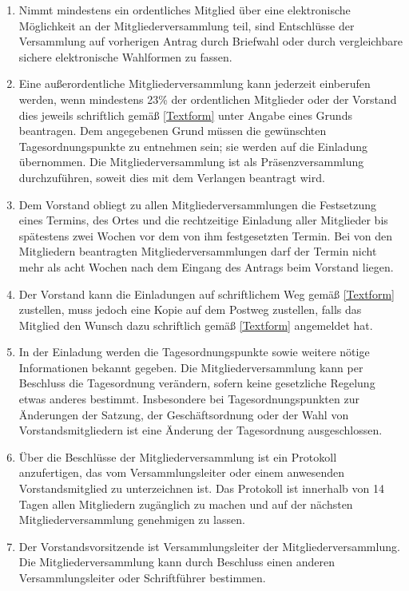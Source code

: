 \documentclass[fontsize=12pt,paper=a4,pagesize,headings=small]{scrartcl}
\begin{document}
\begin{enumerate}
    \item Nimmt mindestens ein ordentliches Mitglied über eine elektronische
    Möglichkeit an der Mitgliederversammlung teil, sind Entschlüsse der
    Versammlung auf vorherigen Antrag durch Briefwahl oder durch
    vergleichbare sichere elektronische Wahlformen zu fassen.

    \item Eine außerordentliche Mitgliederversammlung kann jederzeit
    einberufen werden, wenn mindestens 23\% der ordentlichen Mitglieder
    oder der Vorstand dies jeweils schriftlich gemäß \ref{Textform}
    unter Angabe eines Grunds beantragen. Dem angegebenen Grund müssen
    die gewünschten Tagesordnungspunkte zu entnehmen sein; sie werden
    auf die Einladung übernommen.
    Die Mitgliederversammlung ist als Präsenzversammlung durchzuführen,
    soweit dies mit dem Verlangen beantragt wird.

    \item Dem Vorstand obliegt zu allen Mitgliederversammlungen die
    Festsetzung eines Termins, des Ortes und die rechtzeitige Einladung
    aller Mitglieder bis spätestens zwei Wochen vor dem von ihm
    festgesetzten Termin. Bei von den Mitgliedern beantragten
    Mitgliederversammlungen darf der Termin nicht mehr als acht Wochen
    nach dem Eingang des Antrags beim Vorstand liegen.

    \item Der Vorstand kann die Einladungen auf schriftlichem Weg gemäß
    \ref{Textform} zustellen, muss jedoch eine Kopie auf dem
    Postweg zustellen, falls das Mitglied den Wunsch dazu schriftlich
    gemäß \ref{Textform} angemeldet hat.

    \item In der Einladung werden die Tagesordnungspunkte sowie weitere
    nötige Informationen bekannt gegeben. Die Mitgliederversammlung
    kann per Beschluss die Tagesordnung verändern, sofern keine
    gesetzliche Regelung etwas anderes bestimmt. Insbesondere bei
    Tagesordnungspunkten zur Änderungen der Satzung, der
    Geschäftsordnung oder der Wahl von Vorstandsmitgliedern ist eine
    Änderung der Tagesordnung ausgeschlossen.

    \item Über die Beschlüsse der Mitgliederversammlung ist ein
    Protokoll anzufertigen, das vom Versammlungsleiter oder einem
    anwesenden Vorstandsmitglied zu unterzeichnen ist. Das Protokoll
    ist innerhalb von 14 Tagen allen Mitgliedern zugänglich zu machen
    und auf der nächsten Mitgliederversammlung genehmigen zu lassen.

    \item Der Vorstandsvorsitzende ist Versammlungsleiter der
    Mitgliederversammlung. Die Mitgliederversammlung kann durch
    Beschluss einen anderen Versammlungsleiter oder Schriftführer
    bestimmen.
\end{enumerate}
\end{document}
